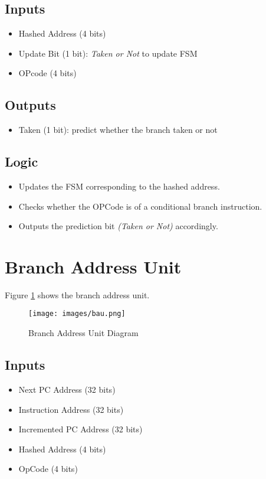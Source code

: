 \subsection{Inputs}
\begin{itemize}
    \item Hashed Address (4 bits)
    \item Update Bit (1 bit): \emph{Taken or Not}  to update FSM
    \item OPcode (4 bits)
\end{itemize}

\subsection{Outputs}
\begin{itemize}
    \item Taken (1 bit): predict whether the branch taken or not
\end{itemize}

\subsection{Logic}
\begin{itemize}
    \item Updates the FSM corresponding to the hashed address.
    \item Checks whether the OPCode is of a conditional branch instruction.
    \item Outputs the prediction bit \emph{(Taken or Not)} accordingly.
\end{itemize}

\section{Branch Address Unit}
Figure \ref{fig:bau} shows the branch address unit.
\begin{figure}[hp]
    \centering
    \texttt{[image: images/bau.png]}
    \caption{Branch Address Unit Diagram}
    \label{fig:bau}
\end{figure}

\subsection{Inputs}
\begin{itemize}
    \item Next PC Address (32 bits)
    \item Instruction Address (32 bits)
    \item Incremented PC Address (32 bits)
    \item Hashed Address (4 bits)
    \item OpCode (4 bits)
\end{itemize}


